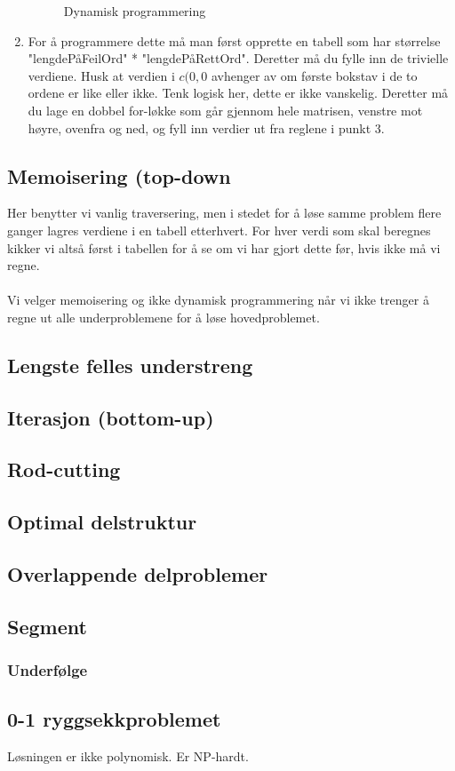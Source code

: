 \begin{enumerate}
\begin{figure}[H]
        \centering %
        \caption{Dynamisk programmering}
        \label{fig:dp}
        \end{figure}
    \item For å programmere dette må man først opprette en tabell som har størrelse "lengdePåFeilOrd" * "lengdePåRettOrd". Deretter må du fylle inn de trivielle verdiene. Husk at verdien i $c(0,0$ avhenger av om første bokstav i de to ordene er like eller ikke. Tenk logisk her, dette er ikke vanskelig. Deretter må du lage en dobbel for-løkke som går gjennom hele matrisen, venstre mot høyre, ovenfra og ned, og fyll inn verdier ut fra reglene i punkt 3.
\end{enumerate}

\subsection{Memoisering (top-down}
Her benytter vi vanlig traversering, men i stedet for å løse samme problem flere ganger lagres verdiene i en tabell etterhvert. For hver verdi som skal beregnes kikker vi altså først i tabellen for å se om vi har gjort dette før, hvis ikke må vi regne.
\\\\
Vi velger memoisering og ikke dynamisk programmering når vi ikke trenger å regne ut alle underproblemene for å løse hovedproblemet.



\subsection{Lengste felles understreng}

\subsection{Iterasjon (bottom-up)}
\subsection{Rod-cutting}
\subsection{Optimal delstruktur}
\subsection{Overlappende delproblemer}
\subsection{Segment}
\subsubsection{Underfølge}
\subsection{0-1 ryggsekkproblemet}
Løsningen er ikke polynomisk. Er NP-hardt.